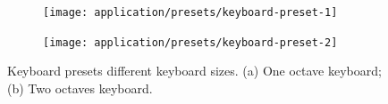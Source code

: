 \begin{figure}[ht]
	\centering
	\begin{subfigure}{0.49\textwidth}
		\centering
		\texttt{[image: application/presets/keyboard-preset-1]}
		\caption{}
		\label{fig:preset-1}
	\end{subfigure}
	\hfill
	\begin{subfigure}{0.49\textwidth}
		\centering
		\texttt{[image: application/presets/keyboard-preset-2]}
		\caption{}
		\label{fig:preset-2}
	\end{subfigure}
	\caption{
		Keyboard presets different keyboard sizes.
		(a) One octave keyboard;
		(b) Two octaves keyboard.
	}
	\label{fig:presets}
\end{figure}
